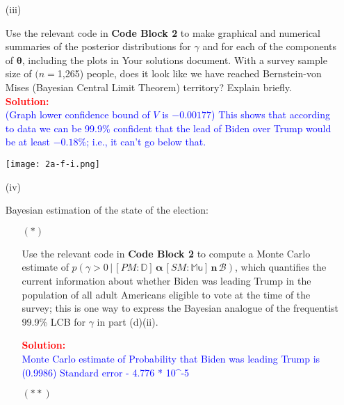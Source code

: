 \documentclass[12pt]{article}
\newcommand{\given}{\, | \,}
\renewcommand{\b}[1]{\textbf{#1}}
\begin{document}
\begin{itemize}
\begin{itemize}
\begin{itemize}
\item[(iii)]

Use the relevant code in \b{Code Block 2} to make graphical and numerical summaries of the posterior distributions for $\gamma$ and for each of the components of $\bm{ \theta }$, including the plots in Your solutions document. With a survey sample size of $(n =$1,265) people, does it look like we have reached Bernstein-von Mises (Bayesian Central Limit Theorem) territory? Explain briefly. \textit{\fbox{\textbf{[10 points]}}} \\
\textcolor{red}{\textbf{Solution:}} \\
\textcolor{blue}{(Graph lower confidence bound of \(V\) is \( -0.00177 \))
This shows that according to data we can be 99.9\% confident that the lead of Biden over Trump would be at least \( -0.18\%\); i.e., it can't go below that.}

\texttt{[image: 2a-f-i.png]}

\item[(iv)]

Bayesian estimation of the state of the election:

\begin{itemize}

\item[$( * )$]

Use the relevant code in \b{Code Block 2} to compute a Monte Carlo estimate of $p ( \gamma > 0 \given [ PM \! \! : \mathbb{ D } ] \, \bm{ \alpha } \, [ SM \! \! : \mathbb{ Mu } ] \, \bm{ n } \, \mathcal{ B } )$, which quantifies the current information about whether Biden was leading Trump in the population of all adult Americans eligible to vote at the time of the survey; this is one way to express the Bayesian analogue of the frequentist 99.9\% LCB for $\gamma$ in part (d)(ii). \textit{\fbox{\textbf{[10 points]}}}

\textcolor{red}{\textbf{Solution:}} \\
\textcolor{blue}{
Monte Carlo estimate of Probability that Biden was leading Trump is (0.9986)
Standard error - 4.776 * 10^-5
}

\item[$( ** )$]


\end{itemize}
\end{itemize}
\end{itemize}
\end{itemize}
\end{document}
